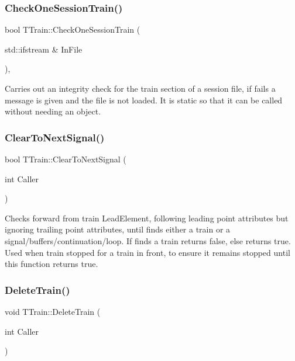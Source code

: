 \subsubsection{\texorpdfstring{Check\+One\+Session\+Train()}{CheckOneSessionTrain()}}
{\footnotesize\ttfamily bool T\+Train\+::\+Check\+One\+Session\+Train (\begin{DoxyParamCaption}\item[{std\+::ifstream \&}]{In\+File }\end{DoxyParamCaption})\hspace{0.3cm}{\ttfamily [static]}, {\ttfamily [private]}}

Carries out an integrity check for the train section of a session file, if fails a message is given and the file is not loaded. It is static so that it can be called without needing an object. \mbox{\label{class_t_train_aeed1f50d8a4f76d7d77991d276758570}} 
\subsubsection{\texorpdfstring{Clear\+To\+Next\+Signal()}{ClearToNextSignal()}}
{\footnotesize\ttfamily bool T\+Train\+::\+Clear\+To\+Next\+Signal (\begin{DoxyParamCaption}\item[{int}]{Caller }\end{DoxyParamCaption})\hspace{0.3cm}{\ttfamily [private]}}

Checks forward from train Lead\+Element, following leading point attributes but ignoring trailing point attributes, until finds either a train or a signal/buffers/continuation/loop. If finds a train returns false, else returns true. Used when train stopped for a train in front, to ensure it remains stopped until this function returns true. \mbox{\label{class_t_train_afd5d7ea375b8a878c31d81841acad159}} 
\subsubsection{\texorpdfstring{Delete\+Train()}{DeleteTrain()}}
{\footnotesize\ttfamily void T\+Train\+::\+Delete\+Train (\begin{DoxyParamCaption}\item[{int}]{Caller }\end{DoxyParamCaption})\hspace{0.3cm}{\ttfamily [private]}}


